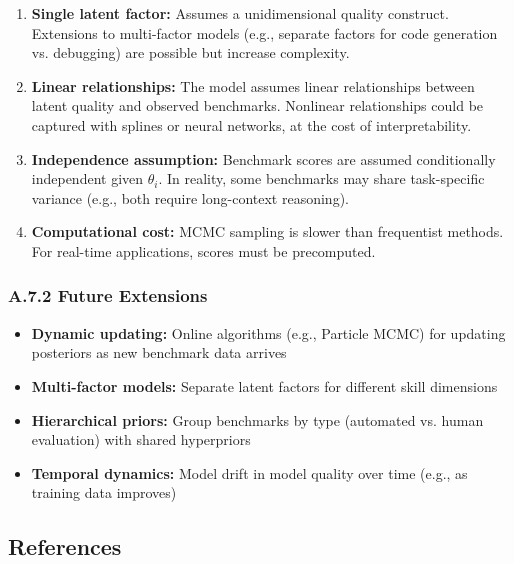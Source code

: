 \begin{enumerate}
    \item \textbf{Single latent factor:} Assumes a unidimensional quality construct. Extensions to multi-factor models (e.g., separate factors for code generation vs. debugging) are possible but increase complexity.
    
    \item \textbf{Linear relationships:} The model assumes linear relationships between latent quality and observed benchmarks. Nonlinear relationships could be captured with splines or neural networks, at the cost of interpretability.
    
    \item \textbf{Independence assumption:} Benchmark scores are assumed conditionally independent given $\theta_i$. In reality, some benchmarks may share task-specific variance (e.g., both require long-context reasoning).
    
    \item \textbf{Computational cost:} MCMC sampling is slower than frequentist methods. For real-time applications, scores must be precomputed.
\end{enumerate}

\subsubsection*{A.7.2 Future Extensions}

\begin{itemize}
    \item \textbf{Dynamic updating:} Online algorithms (e.g., Particle MCMC) for updating posteriors as new benchmark data arrives
    \item \textbf{Multi-factor models:} Separate latent factors for different skill dimensions
    \item \textbf{Hierarchical priors:} Group benchmarks by type (automated vs. human evaluation) with shared hyperpriors
    \item \textbf{Temporal dynamics:} Model drift in model quality over time (e.g., as training data improves)
\end{itemize}

\subsection*{References}

